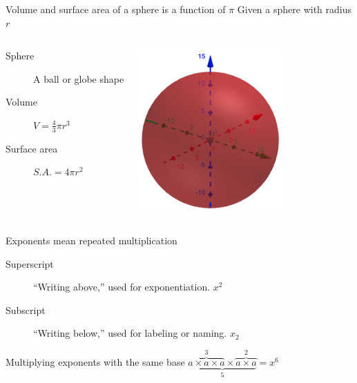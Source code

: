\begin{frame}{Volume and surface area of a sphere is a function of $\pi$} 
  Given a sphere with radius $r$
  \vspace{0.5cm}
  \begin{columns}
    \begin{description}
      \item[Sphere] A ball or globe shape
      \item[Volume] $V= \frac{4}{3} \pi r^3$
      \item[Surface area] $S.A.= 4 \pi r^2$ 
    \end{description}
    \includegraphics[width=0.8\textwidth]{../graphics/04sphere.png}
  \end{columns} \vspace{0.5cm}
  \end{frame}
  
\begin{frame}{Exponents mean repeated multiplication} 
  \vspace{0.5cm}
  \begin{description}
    \item[Superscript] ``Writing above,'' used for exponentiation. $x^2$
    \item[Subscript] ``Writing below,'' used for labeling or naming. $x_2$
  \end{description}
    Multiplying exponents with the same base
    $\underbrace{\overbrace{a \times a \times a}^3
    \times \overbrace{a \times a}^2}
    _\text{5} = x^6$

  \end{frame}

